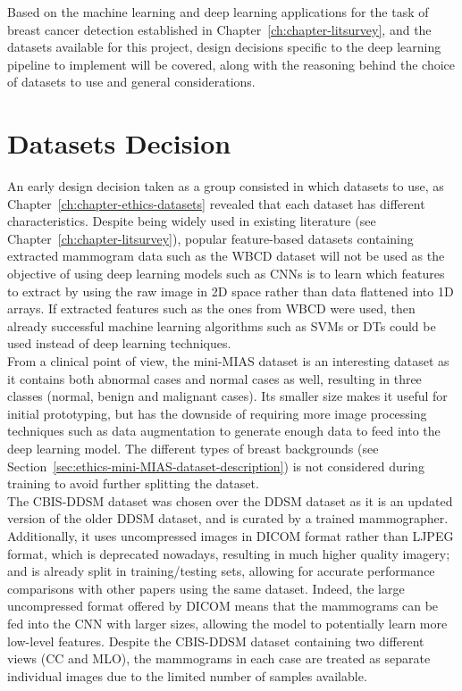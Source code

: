 Based on the machine learning and deep learning applications for the task of breast cancer detection established in Chapter~\ref{ch:chapter-litsurvey}, and the datasets available for this project, design decisions specific to the deep learning pipeline to implement will be covered, along with the reasoning behind the choice of datasets to use and general considerations.

\section{Datasets Decision}

An early design decision taken as a group consisted in which datasets to use, as Chapter~\ref{ch:chapter-ethics-datasets} revealed that each dataset has different characteristics. Despite being widely used in existing literature (see Chapter~\ref{ch:chapter-litsurvey}), popular feature-based datasets containing extracted mammogram data such as the WBCD dataset \citep{Wolberg1995} will not be used as the objective of using deep learning models such as CNNs is to learn which features to extract by using the raw image in 2D space rather than data flattened into 1D arrays. If extracted features such as the ones from WBCD were used, then already successful machine learning algorithms such as SVMs or DTs could be used instead of deep learning techniques.\\

From a clinical point of view, the mini-MIAS dataset is an interesting dataset as it contains both abnormal cases and normal cases as well, resulting in three classes (normal, benign and malignant cases). Its smaller size makes it useful for initial prototyping, but has the downside of requiring more image processing techniques such as data augmentation to generate enough data to feed into the deep learning model. The different types of breast backgrounds (see Section~\ref{sec:ethics-mini-MIAS-dataset-description}) is not considered during training to avoid further splitting the dataset.\\

The CBIS-DDSM dataset was chosen over the DDSM dataset as it is an updated version of the older DDSM dataset, and is curated by a trained mammographer. Additionally, it uses uncompressed images in DICOM format rather than LJPEG format, which is deprecated nowadays, resulting in much higher quality imagery; and is already split in training/testing sets, allowing for accurate performance comparisons with other papers using the same dataset. Indeed, the large uncompressed format offered by DICOM means that the mammograms can be fed into the CNN with larger sizes, allowing the model to potentially learn more low-level features. Despite the CBIS-DDSM dataset containing two different views (CC and MLO), the mammograms in each case are treated as separate individual images due to the limited number of samples available.\\

